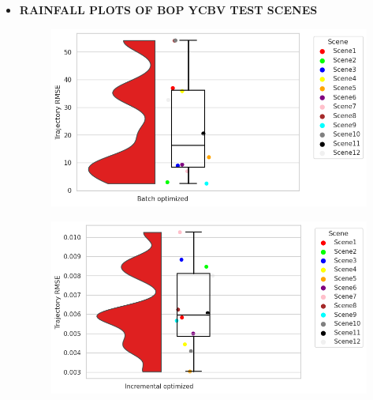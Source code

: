 \documentclass[report.tex]{subfiles}
\begin{document}
\begin{itemize}
    \item \textbf{RAINFALL PLOTS OF BOP YCBV TEST SCENES}


\begin{figure}[H]
\centering
\begin{minipage}{.45\textwidth}
  \centering
  \includegraphics[scale=0.45]{Images/Trajectory_RMSE_batch.png}
  \label{fig:Trajectory_RMSE_batch.png}
\end{minipage}%
\begin{minipage}{.45\textwidth}
  \centering
  \includegraphics[scale=0.45]{Images/Trajectory_RMSE_incre.png}
  \label{fig:Trajectory_RMSE_incre.png}
\end{minipage}
\end{figure}



\end{itemize}
\end{document}
